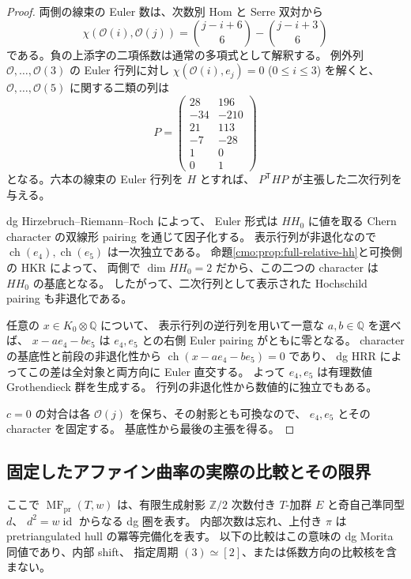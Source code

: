 \begin{proof}
両側の線束の Euler 数は、次数別 Hom と Serre 双対から
\[
 \chi(\mathcal O(i),\mathcal O(j))
 =
 \binom{j-i+6}{6}-\binom{j-i+3}{6}
\]
である。負の上添字の二項係数は通常の多項式として解釈する。
例外列 $\mathcal O,\ldots,\mathcal O(3)$ の Euler 行列に対し
$\chi(\mathcal O(i),e_j)=0$ ($0\le i\le3$) を解くと、
$\mathcal O,\ldots,\mathcal O(5)$ に関する二類の列は
\[
 P=
 \begin{pmatrix}
 28&196\\
 -34&-210\\
 21&113\\
 -7&-28\\
 1&0\\
 0&1
 \end{pmatrix}
\]
となる。六本の線束の Euler 行列を $H$ とすれば、
$P^{\mathsf T}HP$ が主張した二次行列を与える。

dg Hirzebruch--Riemann--Roch
\cite[Theorem~3.5 and \S3.2]{CMOShklyarovHRR}によって、
Euler 形式は $HH_0$ に値を取る Chern character の双線形 pairing を通じて因子化する。
表示行列が非退化なので $\operatorname{ch}(e_4),\operatorname{ch}(e_5)$ は一次独立である。
命題\ref{cmo:prop:full-relative-hh}と可換側の HKR によって、
両側で $\dim HH_0=2$ だから、この二つの character は $HH_0$ の基底となる。
したがって、二次行列として表示された Hochschild pairing も非退化である。

任意の $x\in K_0\otimes\mathbb Q$ について、
表示行列の逆行列を用いて一意な $a,b\in\mathbb Q$ を選べば、
$x-ae_4-be_5$ は $e_4,e_5$ との右側 Euler pairing がともに零となる。
character の基底性と前段の非退化性から
$\operatorname{ch}(x-ae_4-be_5)=0$ であり、
dg HRR によってこの差は全対象と両方向に Euler 直交する。
よって $e_4,e_5$ は有理数値 Grothendieck 群を生成する。
行列の非退化性から数値的に独立でもある。

$c=0$ の対合は各 $\mathcal O(j)$ を保ち、その射影とも可換なので、
$e_4,e_5$ とその character を固定する。
基底性から最後の主張を得る。
\end{proof}

\subsection{固定したアファイン曲率の実際の比較とその限界}

ここで $\operatorname{MF}_{\mathrm{pr}}(T,w)$ は、有限生成射影
$\mathbb Z/2$ 次数付き $T$-加群 $E$ と奇自己準同型 $d$、
$d^2=w\operatorname{id}$ からなる dg 圏を表す。
内部次数は忘れ、上付き $\pi$ は pretriangulated hull の冪等完備化を表す。
以下の比較はこの意味の dg Morita 同値であり、内部 shift、
指定周期 $(3)\simeq[2]$、または係数方向の比較核を含まない。

